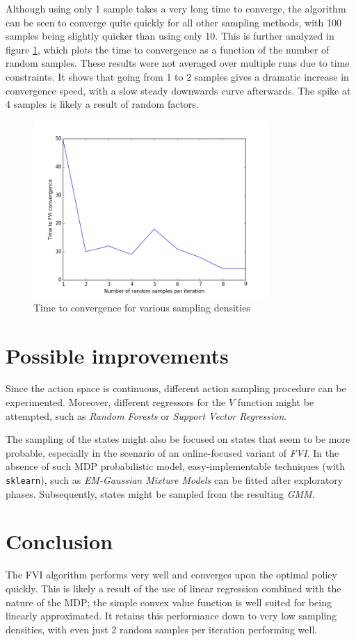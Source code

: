 \documentclass[a4paper, 12pt]{article}
\begin{document}
Although using only 1 sample takes a very long time to converge, the algorithm
can be seen to converge quite quickly for all other sampling methods, with 100
samples being slightly quicker than using only 10. This is further analyzed in
figure \ref{fig:n}, which plots the time to convergence as a function of the
number of random samples. These results were not averaged over multiple runs due
to time constraints. It shows that going from 1 to 2 samples gives a dramatic
increase in convergence speed, with a slow steady downwards curve afterwards.
The spike at 4 samples is likely a result of random factors.

\begin{figure}[htb]
  \centering
  \includegraphics[width=0.8\textwidth]{n_samples.png}
  \caption{Time to convergence for various sampling densities}
  \label{fig:n}
\end{figure}

\FloatBarrier

\section*{Possible improvements}

Since the action space is continuous, different action sampling procedure
can be experimented. Moreover, different regressors for the 
$V$ function might be attempted,
such as \emph{Random Forests} or \emph{Support Vector Regression}.

The sampling of the states might also be focused on states that 
seem to be more probable, especially in the scenario of 
an online-focused variant
of \emph{FVI}. In the absence of such MDP probabilistic model,
easy-implementable techniques (with \texttt{sklearn}), such as
\emph{EM-Gaussian Mixture Models} can be fitted
after exploratory phases. Subsequently,
states might be sampled from the resulting \emph{GMM}.

\section*{Conclusion}
The FVI algorithm performs very well and converges upon the optimal policy
quickly. This is likely a result of the use of linear regression combined with
the nature of the MDP; the simple convex value function is well suited for being
linearly approximated. It retains this performance down to very low sampling
densities, with even just 2 random samples per iteration performing well.



\end{document}
